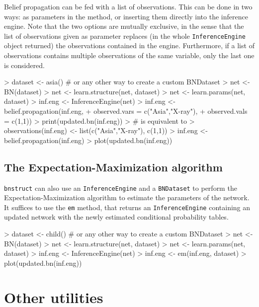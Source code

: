 \documentclass{article}
\newcommand{\Robject}[1]{{\texttt{#1}}}
\newcommand{\Rpackage}[1]{{\texttt{#1}}}
\newcommand{\Rmethod}[1]{{\texttt{#1}}}
\begin{document}
Belief propagation can be fed with a list of observations. This can be done in two ways: as parameters in the method,
or inserting them directly into the inference engine. Note that the two options are mutually exclusive, in the sense that
the list of observations given as parameter replaces (in the whole \Robject{InferenceEngine} object returned)
the observations contained in the engine. Furthermore, if a list of observations contains multiple observations
of the same variable, only the last one is considered.
\begin{Schunk}
\begin{Sinput}
> dataset <- asia() # or any other way to create a custom BNDataset
> net     <- BN(dataset)
> net     <- learn.structure(net, dataset)
> net     <- learn.params(net, dataset)
> inf.eng <- InferenceEngine(net)
> inf.eng <- belief.propagation(inf.eng,
+                               observed.vars = c("Asia","X-ray"),
+                               observed.vals = c(1,1))
> print(updated.bn(inf.eng))
> # is equivalent to
> observations(inf.eng) <- list(c("Asia","X-ray"), c(1,1))
> inf.eng <- belief.propagation(inf.eng)
> plot(updated.bn(inf.eng))
\end{Sinput}
\end{Schunk}

\subsection{The Expectation-Maximization algorithm}
\Rpackage{bnstruct} can also use an \Robject{InferenceEngine} and a \Robject{BNDataset} to perform
the Expectation-Maximization algorithm to estimate the parameters of the network.
It suffices to use the \Rmethod{em} method, that returns an \Robject{InferenceEngine} containing
an updated network with the newly estimated conditional probability tables.
\begin{Schunk}
\begin{Sinput}
> dataset <- child() # or any other way to create a custom BNDataset
> net     <- BN(dataset)
> net     <- learn.structure(net, dataset)
> net     <- learn.params(net, dataset)
> inf.eng <- InferenceEngine(net)
> inf.eng <- em(inf.eng, dataset)
> plot(updated.bn(inf.eng))
\end{Sinput}
\end{Schunk}

\section{Other utilities}
\end{document}
